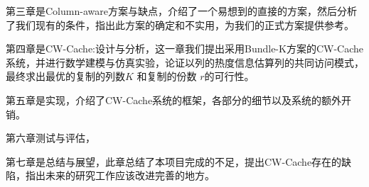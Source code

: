\par 第三章是Column-aware方案与缺点，介绍了一个易想到的直接的方案，然后分析了我们现有的条件，指出此方案的确定和不实用，为我们的正式方案提供参考。

\par 第四章是CW-Cache:设计与分析，这一章我们提出采用Bundle-K方案的CW-Cache系统，并进行数学建模与仿真实验，论证以列的热度信息估算列的共同访问模式，最终求出最优的复制的列数$K$ 和复制的份数 $r$的可行性。

\par 第五章是实现，介绍了CW-Cache系统的框架，各部分的细节以及系统的额外开销。

\par 第六章测试与评估，

\par 第七章是总结与展望，此章总结了本项目完成的不足，提出CW-Cache存在的缺陷，指出未来的研究工作应该改进完善的地方。

